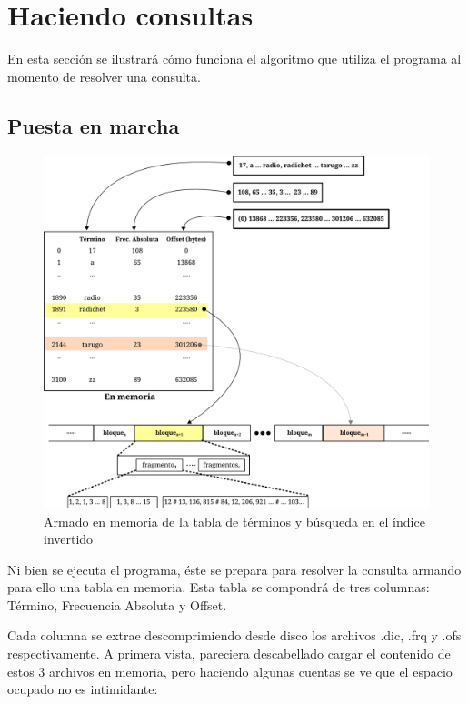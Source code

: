 \section{Haciendo consultas}

En esta sección se ilustrará cómo funciona el algoritmo que utiliza el programa al momento de resolver una consulta.

\subsection{Puesta en marcha}

\begin{figure}[!ht]
\centering
    \includegraphics[scale=0.8]{./Images/consulta1.png}
\caption{Armado en memoria de la tabla de términos y búsqueda en el índice invertido}
\label{fig:consulta1}
\end{figure}


Ni bien se ejecuta el programa, éste se prepara para resolver la consulta armando para ello una tabla en memoria. Esta tabla se compondrá de tres columnas: Término, Frecuencia Absoluta y Offset.

Cada columna se extrae descomprimiendo desde disco los archivos .dic, .frq y .ofs respectivamente.
A primera vista, pareciera descabellado cargar el contenido de estos 3 archivos en memoria, pero haciendo algunas cuentas se ve que el espacio ocupado no es intimidante:

